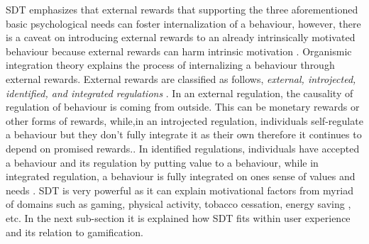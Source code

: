 \documentclass{sig-alternate}
\begin{document}
SDT emphasizes that external rewards that supporting the three aforementioned basic psychological needs can foster internalization of a behaviour, however, there is a caveat on introducing external rewards to an already intrinsically motivated behaviour because external rewards can harm intrinsic motivation \cite{ryan2000:self}.\newline
Organismic integration theory explains the process of internalizing a behaviour through external rewards. External rewards are classified as follows, \emph{external, introjected, identified, and integrated regulations} \cite{ryan2000:self,lee2015:relating}. In an external regulation, the causality of  regulation of behaviour is coming from outside. This can be monetary rewards or other forms of rewards, while,in an introjected regulation, individuals self-regulate a behaviour but they don't fully integrate it as their own therefore it continues to depend on promised rewards.\cite {lee2015:relating}. In identified  regulations, individuals have accepted a behaviour and its regulation by putting value to a behaviour, while in integrated regulation,  a behaviour is fully integrated on ones sense of values and needs \cite{lee2015:relating}.\newline 
SDT is very powerful as it can explain motivational factors from myriad of domains such as gaming\cite{ryan2006:motivationalpull}, physical activity\cite{power2011:obesity}, tobacco cessation\cite{williams2006:testing}, energy saving \cite{webb2013:self}, etc. In the next sub-section it is explained how SDT fits within user experience and its relation to gamification.  
\end{document}
